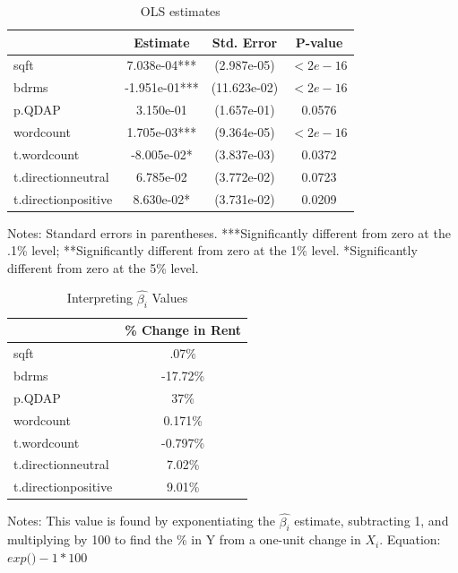 \documentclass[12pt,english]{article}
\begin{document}
\begin{table}[ht]
\caption{OLS estimates}
\label{tab:estimates}
\centering
\begin{threeparttable}
\begin{tabular}{lccc}
\toprule
                            & Estimate    & Std. Error & P-value \\
\midrule
sqft        & 7.038e-04***   & (2.987e-05)    & $<2e-16$    \\
bdrms  & -1.951e-01***   & (11.623e-02)   & $<2e-16$ \\
p.QDAP        &      3.150e-01 & (1.657e-01)  & 0.0576 \\
wordcount     &    1.705e-03***  & (9.364e-05)    & $<2e-16$\\
t.wordcount & -8.005e-02*  & (3.837e-03) & 0.0372 \\
t.directionneutral & 6.785e-02 & (3.772e-02) & 0.0723 \\
t.directionpositive & 8.630e-02* & (3.731e-02) & 0.0209 \\
\bottomrule
\end{tabular}
\footnotesize Notes: Standard errors in parentheses. ***Significantly different from zero at the .1\% level; **Significantly different from zero at the 1\% level. *Significantly different from zero at the 5\% level. 
\end{threeparttable}
\end{table}


\begin{table}[h]
\caption{Interpreting $\hat{\beta_i}$ Values}
\centering
\label{tab:interps}
\begin{threeparttable}
\begin{tabular}{lc}
\toprule
                            & \% Change in Rent\\
\midrule
sqft        & .07\%  \\
bdrms  & -17.72\% \\
p.QDAP        &  37\% \\
wordcount     &    0.171\% \\
t.wordcount & -0.797\% \\
t.directionneutral & 7.02\% \\
t.directionpositive & 9.01\% \\
\bottomrule
\end{tabular}
\footnotesize Notes: This value is found by exponentiating the $\hat{\beta_i}$ estimate, subtracting 1, and multiplying by 100 to find the \% in Y from a one-unit change in $X_i$. Equation: $ exp($$) - 1 * 100$
\end{threeparttable}
\end{table}
\end{document}
